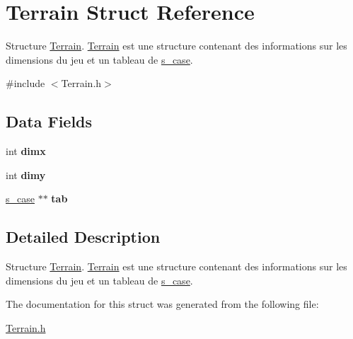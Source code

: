 \hypertarget{struct_terrain}{\section{Terrain Struct Reference}
\label{struct_terrain}
}


Structure \hyperlink{struct_terrain}{Terrain}. \hyperlink{struct_terrain}{Terrain} est une structure contenant des informations sur les dimensions du jeu et un tableau de \hyperlink{structs__case}{s\-\_\-case}.  




{\ttfamily \#include $<$Terrain.\-h$>$}

\subsection*{Data Fields}
\begin{DoxyCompactItemize}
\item 
\hypertarget{struct_terrain_a8b0f6ae031a507c3ffb7bf0eec290d46}{int {\bfseries dimx}}\label{struct_terrain_a8b0f6ae031a507c3ffb7bf0eec290d46}

\item 
\hypertarget{struct_terrain_a3a072d6ef9c51d085b44eac70f2edff6}{int {\bfseries dimy}}\label{struct_terrain_a3a072d6ef9c51d085b44eac70f2edff6}

\item 
\hypertarget{struct_terrain_ac72e0ea307e59455aa2659e1f19ed28e}{\hyperlink{structs__case}{s\-\_\-case} $\ast$$\ast$ {\bfseries tab}}\label{struct_terrain_ac72e0ea307e59455aa2659e1f19ed28e}

\end{DoxyCompactItemize}


\subsection{Detailed Description}
Structure \hyperlink{struct_terrain}{Terrain}. \hyperlink{struct_terrain}{Terrain} est une structure contenant des informations sur les dimensions du jeu et un tableau de \hyperlink{structs__case}{s\-\_\-case}. 

The documentation for this struct was generated from the following file\-:\begin{DoxyCompactItemize}
\item 
\hyperlink{_terrain_8h}{Terrain.\-h}\end{DoxyCompactItemize}

